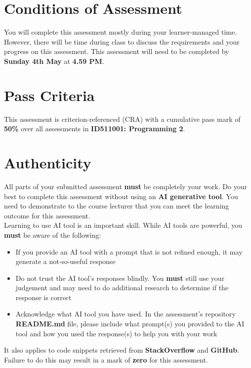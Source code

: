 \documentclass{article}
\begin{document}
\section*{Conditions of Assessment}
You will complete this assessment mostly during your learner-managed time. However, there will be time during class to discuss the requirements and your progress on this assessment. This assessment will need to be completed by  \textbf{Sunday 4th May} at \textbf{4.59 PM}.

\section*{Pass Criteria}
This assessment is criterion-referenced (CRA) with a cumulative pass mark of \textbf{50\%} over all assessments in \textbf{ID511001: Programming 2}.

\section*{Authenticity}
All parts of your submitted assessment \textbf{must} be completely your work. Do your best to complete this assessment without using an \textbf{AI generative tool}. You need to demonstrate to the course lecturer that you can meet the learning outcome for this assessment. \\
 
Learning to use AI tool is an important skill. While AI tools are powerful, you \textbf{must} be aware of the following:

\begin{itemize}
    \item If you provide an AI tool with a prompt that is not refined enough, it may generate a not-so-useful response
    \item Do not trust the AI tool's responses blindly. You \textbf{must} still use your judgement and may need to do additional research to determine if the response is correct
    \item Acknowledge what AI tool you have used. In the assessment's repository \textbf{README.md} file, please include what prompt(s) you provided to the AI tool and how you used the response(s) to help you with your work
\end{itemize}

It also applies to code snippets retrieved from \textbf{StackOverflow} and \textbf{GitHub}. \\
 
Failure to do this may result in a mark of \textbf{zero} for this assessment. 
\end{document}
